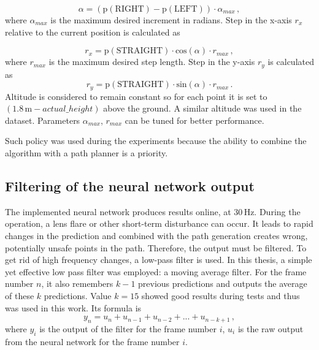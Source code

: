 \begin{equation}
	\alpha = (\textrm{p}(\textrm{RIGHT}) - \textrm{p}(\textrm{LEFT}))\cdot \alpha_{max}\,,
\end{equation}
where $\alpha_{max}$ is the maximum desired increment in radians. Step in the x-axis $r_x$ relative to the current position is calculated as

\begin{equation}
	r_x = \textrm{p}(\textrm{STRAIGHT})\cdot \textrm{cos}(\alpha)\cdot r_{max}\,,
\end{equation}
where $r_{max}$ is the maximum desired step length. Step in the y-axis $r_y$ is calculated as
\begin{equation}
	r_y = \textrm{p}(\textrm{STRAIGHT})\cdot \textrm{sin}(\alpha)\cdot r_{max}\,.
\end{equation}
Altitude is considered to remain constant so for each point it is set to $(1.8\,\textrm{m} - actual\_height)$ above the ground. A similar altitude was used in the dataset. Parameters $\alpha_{max}$, $r_{max}$ can be tuned for better performance.

Such policy was used during the experiments because the ability to combine the algorithm with a path planner is a priority.

\subsection{Filtering of the neural network output}

The implemented neural network produces results online, at 30\,Hz. During the operation, a lens flare or other short-term disturbance can occur. It leads to rapid changes in the prediction and combined with the path generation creates wrong, potentially unsafe points in the path. Therefore, the output must be filtered. To get rid of high frequency changes, a low-pass filter is used. In this thesis, a simple yet effective low pass filter was employed: a moving average filter. For the frame number $n$, it also remembers $k-1$ previous predictions and outputs the average of these $k$ predictions. Value $k=15$ showed good results during tests and thus was used in this work. Its formula is
\begin{equation}
	y_n = u_n + u_{n-1} + u_{n-2} + ... + u_{n-k+1}\,,
\end{equation}
where $y_i$ is the output of the filter for the frame number $i$, $u_i$ is the raw output from the neural network for the frame number $i$.

